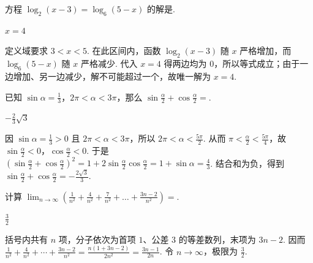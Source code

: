 \begin{problem}
方程 \(\log_2(x-3)=\log_6(5-x)\) 的解是\fillinblank{}.
\end{problem}

\begin{answer}
\(x=4\)
\end{answer}

\begin{solution}
定义域要求 \(3<x<5\). 在此区间内，函数 \(\log_2(x-3)\) 随 \(x\) 严格增加，而 \(\log_6(5-x)\) 随 \(x\) 严格减少. 代入 \(x=4\) 得两边均为 \(0\)，所以等式成立；由于一边增加、另一边减少，解不可能超过一个，故唯一解为 \(x=4\).
\end{solution}

\begin{problem}
已知 \(\sin \alpha=\frac{1}{3}\)，\(2\pi<\alpha<3\pi\)，那么 \(\sin \frac{\alpha}{2}+\cos \frac{\alpha}{2}=\)\fillinblank{}.
\end{problem}

\begin{answer}
\(-\frac{2}{3}\sqrt{3}\)
\end{answer}

\begin{solution}
因 \(\sin\alpha=\frac{1}{3}>0\) 且 \(2\pi<\alpha<3\pi\)，所以 \(2\pi<\alpha<\frac{5\pi}{2}\). 从而 \(\pi<\frac{\alpha}{2}<\frac{5\pi}{4}\)，故 \(\sin\frac{\alpha}{2}<0\)，\(\cos\frac{\alpha}{2}<0\). 于是 \(\left(\sin\frac{\alpha}{2}+\cos\frac{\alpha}{2}\right)^2=1+2\sin\frac{\alpha}{2}\cos\frac{\alpha}{2}=1+\sin\alpha=\frac{4}{3}\). 结合和为负，得到 \(\sin\frac{\alpha}{2}+\cos\frac{\alpha}{2}=-\frac{2\sqrt{3}}{3}\).
\end{solution}

\begin{problem}
计算 \(\displaystyle\lim_{n\to\infty}\left( \frac{1}{n^2}+\frac{4}{n^2}+\frac{7}{n^2}+\dots+\frac{3n-2}{n^2} \right)=\)\fillinblank{}.
\end{problem}

\begin{answer}
\(\frac{3}{2}\)
\end{answer}

\begin{solution}
括号内共有 \(n\) 项，分子依次为首项 \(1\)、公差 \(3\) 的等差数列，末项为 \(3n-2\). 因而 \(\frac{1}{n^2}+\frac{4}{n^2}+\cdots+\frac{3n-2}{n^2}=\frac{n\left(1+3n-2\right)}{2n^2}=\frac{3n-1}{2n}\). 令 \(n\to\infty\)，极限为 \(\frac{3}{2}\).
\end{solution}

